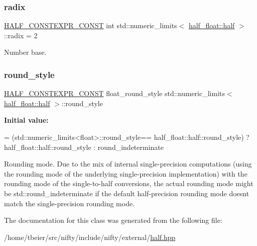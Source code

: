 \subsubsection{\texorpdfstring{radix}{radix}}
{\footnotesize\ttfamily \hyperlink{half_8hpp_a5df92c245e5d4e45d35fad7b6de73354}{H\+A\+L\+F\+\_\+\+C\+O\+N\+S\+T\+E\+X\+P\+R\+\_\+\+C\+O\+N\+ST} int std\+::numeric\+\_\+limits$<$ \hyperlink{classhalf__float_1_1half}{half\+\_\+float\+::half} $>$\+::radix = 2\hspace{0.3cm}{\ttfamily [static]}}



Number base. 

\mbox{\label{classstd_1_1numeric__limits_3_01half__float_1_1half_01_4_a17a70ce9e02f8b890a0ebf5eb04c385b}} 
\subsubsection{\texorpdfstring{round\+\_\+style}{round\_style}}
{\footnotesize\ttfamily \hyperlink{half_8hpp_a5df92c245e5d4e45d35fad7b6de73354}{H\+A\+L\+F\+\_\+\+C\+O\+N\+S\+T\+E\+X\+P\+R\+\_\+\+C\+O\+N\+ST} float\+\_\+round\+\_\+style std\+::numeric\+\_\+limits$<$ \hyperlink{classhalf__float_1_1half}{half\+\_\+float\+::half} $>$\+::round\+\_\+style\hspace{0.3cm}{\ttfamily [static]}}

{\bfseries Initial value\+:}
\begin{DoxyCode}
= (std::numeric\_limits<float>::round\_style==
            half\_float::half::round\_style) ? half\_float::half::round\_style : round\_indeterminate
\end{DoxyCode}
Rounding mode. Due to the mix of internal single-\/precision computations (using the rounding mode of the underlying single-\/precision implementation) with the rounding mode of the single-\/to-\/half conversions, the actual rounding mode might be {\ttfamily std\+::round\+\_\+indeterminate} if the default half-\/precision rounding mode doesn\textquotesingle{}t match the single-\/precision rounding mode. 

The documentation for this class was generated from the following file\+:\begin{DoxyCompactItemize}
\item 
/home/tbeier/src/nifty/include/nifty/external/\hyperlink{half_8hpp}{half.\+hpp}\end{DoxyCompactItemize}

